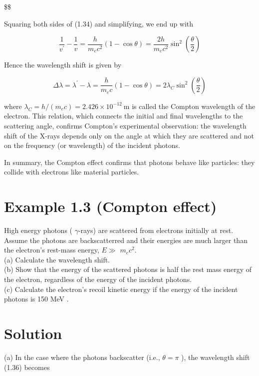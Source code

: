 \documentclass[10pt]{article}
\begin{document}
\$\$

Squaring both sides of (1.34) and simplifying, we end up with


\begin{equation*}
\frac{1}{v^{\prime}}-\frac{1}{v}=\frac{h}{m_{e} c^{2}}(1-\cos \theta)=\frac{2 h}{m_{e} c^{2}} \sin ^{2}\left(\frac{\theta}{2}\right) \tag{1.35}
\end{equation*}


Hence the wavelength shift is given by


\begin{equation*}
\Delta \lambda=\lambda^{\prime}-\lambda=\frac{h}{m_{e} c}(1-\cos \theta)=2 \lambda_{C} \sin ^{2}\left(\frac{\theta}{2}\right) \tag{1.36}
\end{equation*}


where $\lambda_{C}=h /\left(m_{e} c\right)=2.426 \times 10^{-12} \mathrm{~m}$ is called the Compton wavelength of the electron. This relation, which connects the initial and final wavelengths to the scattering angle, confirms Compton's experimental observation: the wavelength shift of the X-rays depends only on the angle at which they are scattered and not on the frequency (or wavelength) of the incident photons.

In summary, the Compton effect confirms that photons behave like particles: they collide with electrons like material particles.

\section*{Example 1.3 (Compton effect)}
High energy photons ( $\gamma$-rays) are scattered from electrons initially at rest. Assume the photons are backscatterred and their energies are much larger than the electron's rest-mass energy, $E \gg$ $m_{e} c^{2}$.\\
(a) Calculate the wavelength shift.\\
(b) Show that the energy of the scattered photons is half the rest mass energy of the electron, regardless of the energy of the incident photons.\\
(c) Calculate the electron's recoil kinetic energy if the energy of the incident photons is 150 MeV .

\section*{Solution}
(a) In the case where the photons backscatter (i.e., $\theta=\pi$ ), the wavelength shift (1.36) becomes
\end{document}
